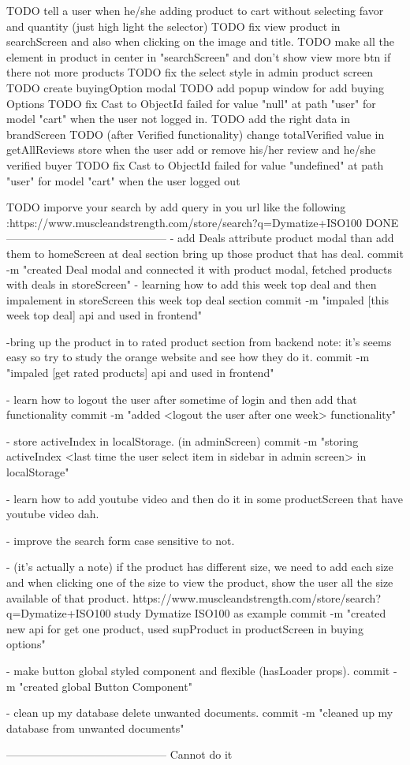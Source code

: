 
TODO   tell a user when he/she adding product to cart without selecting favor and quantity (just high light the selector)
TODO   fix view product in searchScreen and also when clicking on the image and title.
TODO   make all the element in product in center in "searchScreen" and don't show view more btn if there not more products
TODO   fix the select style in admin product screen
TODO   create buyingOption modal 
TODO   add popup window for add buying Options
TODO   fix Cast to ObjectId failed for value "null" at path "user" for model "cart" when the user not logged in.
TODO   add the right data in brandScreen 
TODO   (after Verified functionality) change totalVerified value in getAllReviews store when the user add or remove his/her review and he/she verified buyer
TODO fix Cast to ObjectId failed for value "undefined" at path 
      "user" for model "cart" when the user logged out

TODO imporve your search by add query in you url like the following :https://www.muscleandstrength.com/store/search?q=Dymatize+ISO100
DONE
--------------------------------------------
- add Deals attribute product modal than add them to homeScreen 
       at deal section bring up those product that has deal.
       commit -m "created Deal modal and connected it with product modal, fetched products with deals in 
       storeScreen"
- learning how to add this week top deal and then impalement in storeScreen this week top deal section
      commit -m "impaled [this week top deal] api and used in frontend"

-bring up the product in to rated product section from backend 
      note: it's seems easy so try to study the orange website and see how they do it.
      commit -m "impaled [get rated products] api and used in frontend"

-   learn how to logout the user after sometime of login and 
            then add that functionality
      commit -m "added <logout the user after one week> functionality"

- store activeIndex in localStorage. (in adminScreen)
      commit -m "storing activeIndex <last time the user select item in sidebar in admin screen> in localStorage"

- learn how to add youtube video and then do it in some 
      productScreen that have youtube video dah.

- improve the search form case sensitive to not.

-  (it's actually a note) if the product has different size, 
      we need to add each size and when
      clicking one of the size to view the product, show the 
      user all the size available of that product.
      https://www.muscleandstrength.com/store/search?q=Dymatize+ISO100
      study Dymatize ISO100 as example
      commit -m "created new api for get one product, used supProduct in productScreen in buying options"

-   make button global styled component and flexible 
      (hasLoader props).
      commit -m "created global Button Component"

- clean up my database delete unwanted documents.
      commit -m "cleaned up my database from unwanted documents"

--------------------------------------------
Cannot do it
